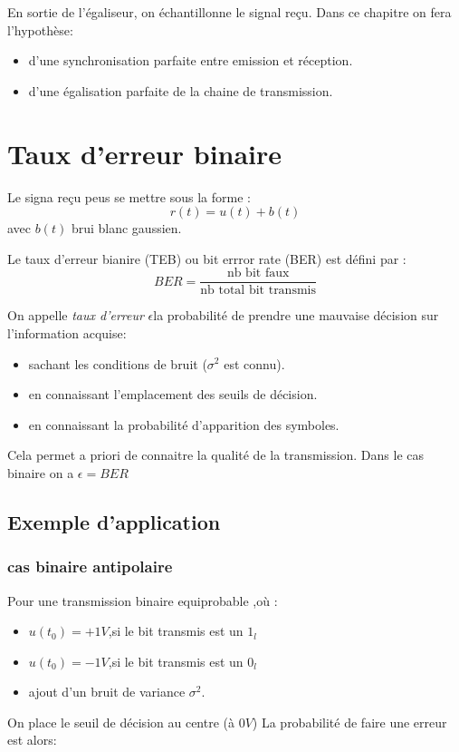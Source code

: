 \documentclass[main.tex]{subfiles}
\begin{document}
En sortie de l'égaliseur, on échantillonne le signal reçu. Dans ce chapitre on fera l'hypothèse:
\begin{itemize}
\item d'une synchronisation parfaite entre emission et réception.
\item d'une égalisation parfaite de la chaine de transmission.
\end{itemize}
\section{Taux d'erreur binaire}
Le signa reçu peus se mettre sous la forme :
\[
r(t) = u(t)+ b(t)
\]
avec $b(t)$ brui blanc gaussien.
\begin{defin}
  Le taux d'erreur bianire  (TEB) ou bit errror rate (BER) est défini par :
  \[
    BER = \frac{\text{ nb bit faux }}{\text{nb total bit transmis}}
  \]
\end{defin}
\begin{defin}
  On appelle \emph{taux d'erreur} $\epsilon$la probabilité de prendre une mauvaise décision sur l'information acquise:
  \begin{itemize}
  \item sachant les conditions de bruit ($\sigma^2$ est connu).
  \item en connaissant l'emplacement des seuils de décision.
  \item en connaissant la probabilité d'apparition des symboles.
  \end{itemize}
\end{defin}
\begin{rem}
  Cela permet a priori de connaitre la qualité de la transmission.
  Dans le cas binaire on a $\epsilon = BER$
\end{rem}

\subsection{Exemple d'application}
\subsubsection{cas binaire antipolaire}
Pour une transmission binaire equiprobable ,où :
\begin{itemize}
\item $u(t_0) = +1V$,si le bit transmis est un $1_l$
\item $u(t_0) = -1V$,si le bit transmis est un $0_l$
\item ajout d'un bruit de variance $\sigma^2$.
\end{itemize}
On place le seuil de décision au centre (à $0V$)
La probabilité de faire une erreur est alors:
\end{document}
